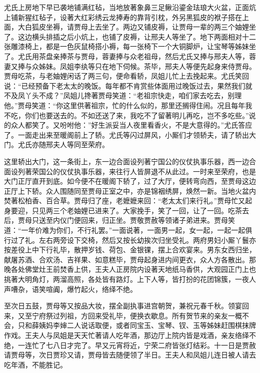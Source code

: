 \begin{parag}
    尤氏上房地下早已袭地铺满红毡，当地放著象鼻三足鳅沿鎏金珐琅大火盆，正面炕上铺新猩红毡子，设著大红彩绣云龙捧寿的靠背引枕，外另黑狐皮的袱子搭在上面，大白狐皮坐褥，请贾母上去坐了。两边又铺皮褥，让贾母一辈的两三个妯娌坐了。这边横头排插之后小炕上，也铺了皮褥，让邢夫人等坐了。地下两面相对十二张雕漆椅上，都是一色灰鼠椅搭小褥，每一张椅下一个大铜脚炉，让宝琴等姊妹坐了。尤氏用茶盘亲捧茶与贾母，蓉妻捧与众老祖母，然后尤氏又捧与邢夫人等，蓉妻又捧与众姊妹。凤姐李纨等只在地下伺候。茶毕，邢夫人等便先起身来侍贾母。贾母吃茶，与老妯娌闲话了两三句，便命看轿，凤姐儿忙上去挽起来。尤氏笑回说：“已经预备下老太太的晚饭。每年都不肯赏些体面用过晚饭过去，果然我们就不及凤丫头不成？”凤姐儿搀著贾母笑道：“老祖宗快走，咱们家去吃去，别理他。”贾母笑道：“你这里供著祖宗，忙的什么似的，那里还搁得住闹。况且每年我不吃，你们也要送去的。不如还送了来，我吃不了留著明儿再吃，岂不多吃些。”说的众人都笑了。又吩咐他：”好生派妥当人夜里看香火，不是大意得的。”尤氏答应了。一面走出来至暖阁前上了轿。尤氏等闪过屏风，小厮们才领轿夫，请了轿出大门。尤氏亦随邢夫人等同至荣府。
\end{parag}


\begin{parag}
    这里轿出大门，这一条街上，东一边合面设列著宁国公的仪仗执事乐器，西一边合面设列著荣国公的仪仗执事乐器，来往行人皆屏退不从此过。一时来至荣府，也是大门正厅直开到底。如今便不在暖阁下轿了，过了大厅，便转弯向西，至贾母这边正厅上下轿。众人围随同至贾母正室之中，亦是锦裀绣屏，焕然一新。当地火盆内焚著松柏香、百合草。贾母归了座，老嬷嬷来回：“老太太们来行礼。”贾母忙又起身要迎，只见两三个老妯娌已进来了。大家挽手，笑了一回，让了一回。吃茶去后，贾母只送至内仪门便回来，归正坐。贾敬贾赦等领诸子弟进来。贾母笑道：“一年价难为你们，不行礼罢。”一面说著，一面男一起，女一起，一起一起俱行过了礼。左右两旁设下交椅，然后又按长幼挨次归坐受礼。两府男妇小厮丫鬟亦按差役上中下行礼毕，散押岁钱、荷包、金银锞，摆上合欢宴来。男东女西归坐，献屠苏酒、合欢汤、吉祥果、如意糕毕，贾母起身进内间更衣，众人方各散出。那晚各处佛堂灶王前焚香上供，王夫人正房院内设著天地纸马香供，大观园正门上也挑著大明角灯，两溜高照，各处皆有路灯。上下人等，皆打扮的花团锦簇，一夜人声嘈杂，语笑喧阗，爆竹起火，络绎不绝。
\end{parag}


\begin{parag}
    至次日五鼓，贾母等又按品大妆，摆全副执事进宫朝贺，兼祝元春千秋。领宴回来，又至宁府祭过列祖，方回来受礼毕，便换衣歇息。所有贺节来的亲友一概不会，只和薛姨妈李婶二人说话取便，或者同宝玉、宝琴、钗、玉等姊妹赶围棋抹牌作戏。王夫人与凤姐是天天忙著请人吃年酒，那边厅上院内皆是戏酒，亲友络绎不绝，一连忙了七八日才完了。早又元宵将近，宁荣二府皆张灯结彩。十一日是贾赦请贾母等，次日贾珍又请，贾母皆去随便领了半日。王夫人和凤姐儿连日被人请去吃年酒，不能胜记。
\end{parag}


